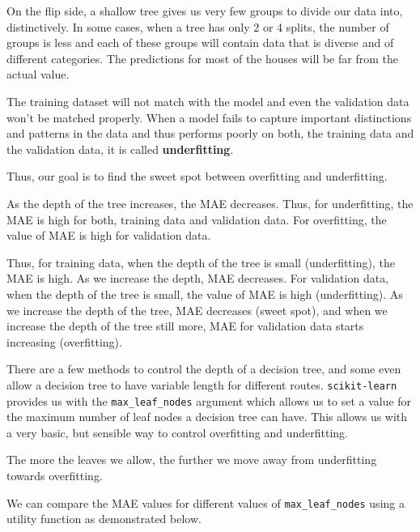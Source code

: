 \documentclass[11pt]{article}
\begin{document}
On the flip side, a shallow tree gives us very few groups to divide our
data into, distinctively. In some cases, when a tree has only 2 or 4
splits, the number of groups is less and each of these groups will
contain data that is diverse and of different categories. The
predictions for most of the houses will be far from the actual value.

The training dataset will not match with the model and even the
validation data won't be matched properly. When a model fails to capture
important distinctions and patterns in the data and thus performs poorly
on both, the training data and the validation data, it is called
\textbf{underfitting}.

Thus, our goal is to find the sweet spot between overfitting and
underfitting.

As the depth of the tree increases, the MAE decreases. Thus, for
underfitting, the MAE is high for both, training data and validation
data. For overfitting, the value of MAE is high for validation data.

Thus, for training data, when the depth of the tree is small
(underfitting), the MAE is high. As we increase the depth, MAE
decreases. For validation data, when the depth of the tree is small, the
value of MAE is high (underfitting). As we increase the depth of the
tree, MAE decreases (sweet spot), and when we increase the depth of the
tree still more, MAE for validation data starts increasing
(overfitting).

    There are a few methods to control the depth of a decision tree, and
some even allow a decision tree to have variable length for different
routes. \texttt{scikit-learn} provides us with the
\texttt{max\_leaf\_nodes} argument which allows us to set a value for
the maximum number of leaf nodes a decision tree can have. This allows
us with a very basic, but sensible way to control overfitting and
underfitting.

The more the leaves we allow, the further we move away from underfitting
towards overfitting.

We can compare the MAE values for different values of
\texttt{max\_leaf\_nodes} using a utility function as demonstrated
below.
\end{document}
